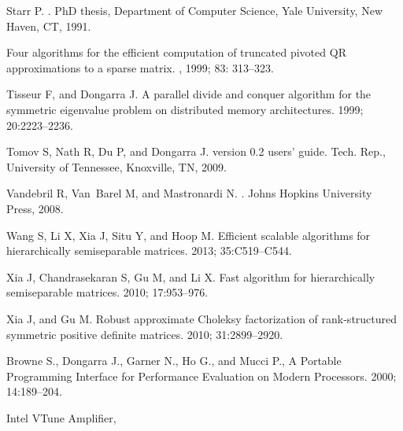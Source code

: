 \documentclass[times]{nlaauth}
\newcounter{algorithm}
\begin{document}
\begin{thebibliography}{99}
{  Starr P.}
.
\newblock PhD thesis, Department of Computer Science, Yale University, New
  Haven, CT, 1991.

\newblock Four algorithms for the efficient computation of truncated pivoted {QR} approximations to a sparse matrix.
, 1999; 83: 313--323.

{  Tisseur F, and Dongarra J.}
\newblock A parallel divide and conquer algorithm for the symmetric eigenvalue
problem on distributed memory architectures.
 1999; 20:2223--2236.

{  Tomov S, Nath R, Du P, and Dongarra J.}
 version 0.2 users' guide.
\newblock Tech. Rep., University of Tennessee, Knoxville, TN, 2009.

{  Vandebril R, Van~Barel M, and Mastronardi N.}
.
\newblock Johns Hopkins University Press, 2008.

{  Wang S, Li X, Xia J, Situ Y, and Hoop M.}
\newblock Efficient scalable algorithms for hierarchically semiseparable
  matrices.
 2013; 35:C519--C544.

{  Xia J, Chandrasekaran S, Gu M, and Li X.}
\newblock Fast algorithm for hierarchically semiseparable matrices.
 2010;  17:953--976.

{  Xia J, and Gu M.}
\newblock Robust approximate {Choleksy} factorization of rank-structured
  symmetric positive definite matrices.
 2010;  31:2899--2920.



{Browne S., Dongarra J., Garner N., Ho G., and Mucci P.,}
\newblock A Portable Programming Interface for Performance Evaluation on Modern Processors.
 2000; 14:189--204.

{Intel VTune Amplifier,}


\end{thebibliography}
\end{document}
